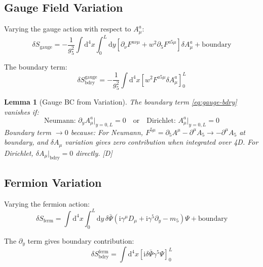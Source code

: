 \documentclass[11pt,a4paper]{article}
\newtheorem{lemma}[theorem]{Lemma}
\newcommand{\dd}{\mathrm{d}}
\newcommand{\ii}{\mathrm{i}}
\begin{document}
\subsection{Gauge Field Variation}

Varying the gauge action with respect to $A_\mu^a$:
\begin{equation}
\delta S_{\text{gauge}} = -\frac{1}{g_5^2} \int \dd^4x \int_0^L \dd y
\left[ \partial_\nu F^{a\nu\mu} + w^2 \partial_5 F^{a5\mu} \right] \delta A_\mu^a + \text{boundary}
\label{eq:gauge-var}
\end{equation}

The boundary term:
\begin{equation}
\delta S_{\text{bdry}}^{\text{gauge}} = -\frac{1}{g_5^2} \int \dd^4x
\left[ w^2 F^{a5\mu} \delta A_\mu^a \right]_0^L
\label{eq:gauge-bdry}
\end{equation}

\begin{lemma}[Gauge BC from Variation]
\label{lem:gauge-bc}
The boundary term \eqref{eq:gauge-bdry} vanishes if:
\begin{equation}
\text{Neumann: } \partial_y A_\mu^a\big|_{y=0,L} = 0 \quad \text{or} \quad
\text{Dirichlet: } A_\mu^a\big|_{y=0,L} = 0
\label{eq:gauge-bc}
\end{equation}
Boundary term $\to 0$ because: For Neumann, $F^{5\mu} = \partial_5 A^\mu - \partial^\mu A_5 \to -\partial^\mu A_5$
at boundary, and $\delta A_\mu$ variation gives zero contribution when integrated over 4D.
For Dirichlet, $\delta A_\mu|_{\text{bdry}} = 0$ directly. [D]
\end{lemma}

\subsection{Fermion Variation}

Varying the fermion action:
\begin{equation}
\delta S_{\text{ferm}} = \int \dd^4x \int_0^L \dd y\, \delta\bar{\Psi}
\left( \ii\gamma^\mu D_\mu + \ii\gamma^5 \partial_y - m_5 \right) \Psi + \text{boundary}
\label{eq:ferm-var}
\end{equation}

The $\partial_y$ term gives boundary contribution:
\begin{equation}
\delta S_{\text{bdry}}^{\text{ferm}} = \int \dd^4x \left[ \ii \delta\bar{\Psi} \gamma^5 \Psi \right]_0^L
\label{eq:ferm-bdry}
\end{equation}
\end{document}
